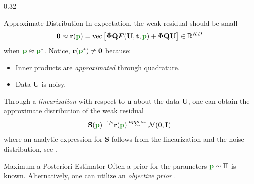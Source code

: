 \documentclass{rummelPoster}
\newcommand{\colwidth}{0.32\linewidth}
\newcommand{\R}{\mathbb{R}} %
\newcommand{\N}{\mathcal{N}} %
\newcommand{\id}{\mathbf{I}} %
\newcommand{\p}{{\color{ForestGreen}\mathbf{p}}}
\renewcommand{\u}{\boldsymbol{u}}
\newcommand{\F}{\boldsymbol{F}}
\renewcommand{\r}{\mathbf{r}}
\renewcommand{\S}{\mathbf{S}}
\newcommand{\Udisc}{\mathbf{U}}
\newcommand{\tdisc}{\mathbf{t}}
\newcommand{\TestFundisc}{\boldsymbol{\Phi}}
\newcommand{\Q}{\mathbf{Q}}
\DeclareMathOperator{\vecOp}{vec}
\begin{document}
\begin{frame}{}
\begin{columns}[t]

\begin{column}{\colwidth}
\begin{block}{Approximate Distribution}
    In expectation, the \alert{weak residual} should be small 
    \small
    \begin{equation}\label{eq:wres}
        \mathbf{0} \approx \r(\p) = \vecOp\left[\dot{\TestFundisc} \Q \F(\Udisc,\tdisc,\p) + \TestFundisc \Q \Udisc\right] \in \R^{KD}
    \end{equation}
    \normalfont
    when $\p \approx \p^*$. Notice, $\r(\p^*) \neq \mathbf{0}$ because: 
    \begin{itemize}
        \item Inner products are \emph{approximated} through quadrature.
        \item Data $\Udisc$ is noisy.
    \end{itemize}

    Through a \emph{linearization} with respect to $\u$ about the data $\Udisc$, one can obtain the \alert{approximate distribution} of the weak residual
    \small
    \begin{equation}\label{eq:weakResDist}
        \S(\p)^{-\nicefrac{1}{2}} \r(\p) \stackrel{approx}{\sim} \N(\mathbf{0}, \id)
    \end{equation}
    \normalfont
    where an analytic expression for $\S$ follows from the linearization and the noise distribution, see \citep{RummelMessengerBeckerEtAl2025arXiv250208881b}.
\end{block}


\begin{block}{Maximum a Posteriori Estimator}
    Often a \alert{prior} for the parameters $\p \sim \Pi$ is known. Alternatively, one can utilize an \emph{objective prior} \citep{JordanMcLoughlin,Robert2007,ChoiRamamoorthi2008InstituteofMathematicalStatisticsCollections}. 


\end{block}
\end{column}
\end{columns}
\end{frame}
\end{document}
